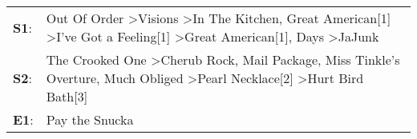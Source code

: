 \begin{supertabular}{p{0.03\textwidth}p{0.92\textwidth}}
 \textbf{S1}:  &  Out Of Order\textsuperscript{} \textgreater \enspace Visions\textsuperscript{} \textgreater \enspace In The Kitchen\textsuperscript{}, \enspace Great American[1]\textsuperscript{} \textgreater \enspace I've Got a Feeling[1]\textsuperscript{} \textgreater \enspace Great American[1]\textsuperscript{},  Days\textsuperscript{} \textgreater \enspace JaJunk\textsuperscript{}  \enspace  \\
 \textbf{S2}:  &                                                  The Crooked One\textsuperscript{} \textgreater \enspace Cherub Rock\textsuperscript{}, \enspace Mail Package\textsuperscript{}, \enspace Miss Tinkle's Overture\textsuperscript{}, \enspace Much Obliged\textsuperscript{} \textgreater \enspace Pearl Necklace[2]\textsuperscript{} \textgreater \enspace Hurt Bird Bath[3]\textsuperscript{}  \enspace  \\
 \textbf{E1}:  &                                                                                                                                                                                                                                                                                                                                                                Pay the Snucka\textsuperscript{}  \enspace  \\
\end{supertabular}

